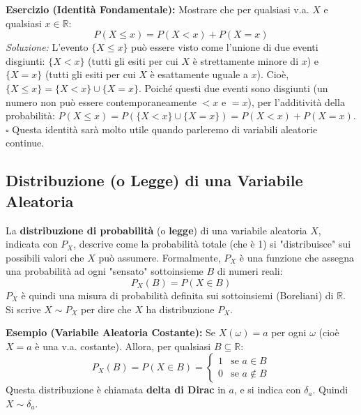 \begin{exercise}
\textbf{Esercizio (Identità Fondamentale):}
Mostrare che per qualsiasi v.a. $X$ e qualsiasi $x \in \mathbb{R}$:
\[ P(X \le x) = P(X < x) + P(X = x) \]
\textit{Soluzione:}
L'evento $\{X \le x\}$ può essere visto come l'unione di due eventi disgiunti:
$\{X < x\}$ (tutti gli esiti per cui $X$ è strettamente minore di $x$) e
$\{X = x\}$ (tutti gli esiti per cui $X$ è esattamente uguale a $x$).
Cioè, $\{X \le x\} = \{X < x\} \cup \{X = x\}$.
Poiché questi due eventi sono disgiunti (un numero non può essere contemporaneamente $<x$ e $=x$), per l'additività della probabilità:
$P(X \le x) = P(\{X < x\} \cup \{X = x\}) = P(X < x) + P(X = x)$. $\square$
Questa identità sarà molto utile quando parleremo di variabili aleatorie continue.
\end{exercise}

\subsection{Distribuzione (o Legge) di una Variabile Aleatoria}
\begin{definition}
La \textbf{distribuzione di probabilità} (o \textbf{legge}) di una variabile aleatoria $X$, indicata con $P_X$, descrive come la probabilità totale (che è 1) si "distribuisce" sui possibili valori che $X$ può assumere.
Formalmente, $P_X$ è una funzione che assegna una probabilità ad ogni "sensato" sottoinsieme $B$ di numeri reali:
\[ P_X(B) = P(X \in B) \]
$P_X$ è quindi una misura di probabilità definita sui sottoinsiemi (Boreliani) di $\mathbb{R}$. Si scrive $X \sim P_X$ per dire che $X$ ha distribuzione $P_X$.
\end{definition}

\begin{example}
\textbf{Esempio (Variabile Aleatoria Costante):}
Se $X(\omega) = a$ per ogni $\omega$ (cioè $X=a$ è una v.a. costante).
Allora, per qualsiasi $B \subseteq \mathbb{R}$:
\[ P_X(B) = P(X \in B) = \begin{cases} 1 & \text{se } a \in B \\ 0 & \text{se } a \notin B \end{cases} \]
Questa distribuzione è chiamata \textbf{delta di Dirac} in $a$, e si indica con $\delta_a$. Quindi $X \sim \delta_a$.
\end{example}

